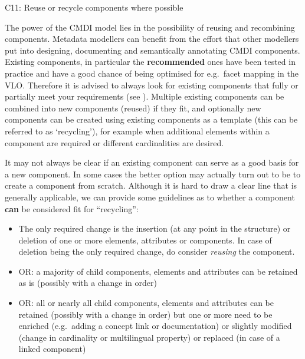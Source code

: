C11: Reuse or recycle components where possible

 

The power of the CMDI model lies in the possibility of reusing and recombining components. Metadata modellers can benefit from the effort that other modellers put into designing, documenting and semantically annotating CMDI components. Existing components, in particular the \textbf{recommended} ones
 have been tested in practice and have a good chance of being optimised for e.g.~facet mapping in the VLO. Therefore it is advised to always look for existing components that fully or partially meet your requirements (see ). Multiple existing components can be combined into new components (reused) if they fit, and optionally new components can be created using existing components as a template (this can be referred to as `recycling'), for example when additional elements within a component are required or different cardinalities are desired.


It may not always be clear if an existing component can serve as a good basis for a new component. In some cases the better option may actually turn out to be to create a component from scratch. Although it is hard to draw a clear line that is generally applicable, we can provide some guidelines as to whether a component \textbf{can} be considered fit for
``recycling'':

\begin{itemize}
\tightlist
\item
  The only required change is the insertion (at any point in the structure) or deletion of one or more elements, attributes or components. In case of deletion being the only required change, do consider \emph{reusing} the component.
\item
  OR: a majority of child components, elements and attributes can be retained as is (possibly with a change in order)
\item
  OR: all or nearly all child components, elements and attributes can be retained (possibly with a change in order) but one or more need to be enriched (e.g.~adding a concept link or documentation) or slightly modified (change in cardinality or multilingual property) or replaced (in case of a linked component)
\end{itemize}

